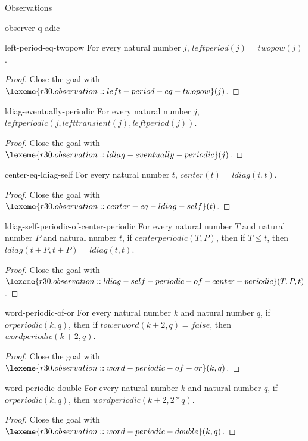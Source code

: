 \begin{lexlean}{Observations}
\begin{section}{observer-q-adic}
\begin{theorem}{left-period-eq-twopow}
For every natural number \(j\), \(leftperiod(j) = twopow(j)\).
\begin{proof}
Close the goal with \(\lexeme{r30.observation::left-period-eq-twopow}(j)\).
\end{proof}
\end{theorem}

\begin{theorem}{ldiag-eventually-periodic}
For every natural number \(j\), \(leftperiodic(j, lefttransient(j), leftperiod(j))\).
\begin{proof}
Close the goal with \(\lexeme{r30.observation::ldiag-eventually-periodic}(j)\).
\end{proof}
\end{theorem}

\begin{theorem}{center-eq-ldiag-self}
For every natural number \(t\), \(center(t) = ldiag(t, t)\).
\begin{proof}
Close the goal with \(\lexeme{r30.observation::center-eq-ldiag-self}(t)\).
\end{proof}
\end{theorem}

\begin{theorem}{ldiag-self-periodic-of-center-periodic}
For every natural number \(T\) and natural number \(P\) and natural number \(t\), if \(centerperiodic(T, P)\), then if \(T ≤ t\), then \(ldiag(t + P, t + P) = ldiag(t, t)\).
\begin{proof}
Close the goal with \(\lexeme{r30.observation::ldiag-self-periodic-of-center-periodic}(T, P, t)\).
\end{proof}
\end{theorem}

\begin{theorem}{word-periodic-of-or}
For every natural number \(k\) and natural number \(q\), if \(orperiodic(k, q)\), then if \(towerword(k + 2, q) = false\), then \(wordperiodic(k + 2, q)\).
\begin{proof}
Close the goal with \(\lexeme{r30.observation::word-periodic-of-or}(k, q)\).
\end{proof}
\end{theorem}

\begin{theorem}{word-periodic-double}
For every natural number \(k\) and natural number \(q\), if \(orperiodic(k, q)\), then \(wordperiodic(k + 2, 2 * q)\).
\begin{proof}
Close the goal with \(\lexeme{r30.observation::word-periodic-double}(k, q)\).
\end{proof}
\end{theorem}


\end{section}
\end{lexlean}
